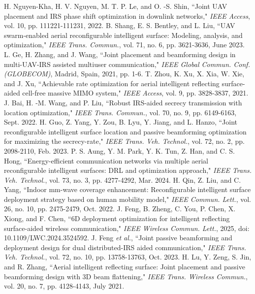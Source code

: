 \documentclass{IEEEoj}
\begin{document}
\begin{thebibliography}{00}
	 H. Nguyen-Kha, H. V. Nguyen, M. T. P. Le, and O. -S. Shin, “Joint UAV placement and IRS phase shift optimization in downlink networks," \textit{IEEE Access}, vol. 10, pp. 111221-111231, 2022.
	 B. Shang, E. S. Bentley, and L. Liu, “UAV swarm-enabled aerial reconfigurable intelligent surface: Modeling, analysis, and optimization," \textit{IEEE Trans. Commun.}, vol. 71, no. 6, pp. 3621-3636, June 2023.
	 L. Ge, H. Zhang, and J. Wang, “Joint placement and beamforming design in multi-UAV-IRS assisted multiuser communication," \textit{IEEE Global Commun. Conf. (GLOBECOM)}, Madrid, Spain, 2021, pp. 1-6.
	 T. Zhou, K. Xu, X. Xia, W. Xie, and J. Xu, “Achievable rate optimization for aerial intelligent reflecting surface-aided cell-free massive MIMO system," \textit{IEEE Access}, vol. 9, pp. 3828-3837, 2021.
	 J. Bai, H. -M. Wang, and P. Liu, “Robust IRS-aided secrecy transmission with location optimization," \textit{IEEE Trans. Commun.}, vol. 70, no. 9, pp. 6149-6163, Sept. 2022.
	 H. Guo, Z. Yang, Y. Zou, B. Lyu, Y. Jiang, and L. Hanzo, “Joint reconfigurable intelligent surface location and passive beamforming optimization for maximizing the secrecy-rate," \textit{IEEE Trans. Veh. Technol.}, vol. 72, no. 2, pp. 2098-2110, Feb. 2023.
	 P. S. Aung, Y. M. Park, Y. K. Tun, Z. Han, and C. S. Hong, “Energy-efficient communication networks via multiple aerial reconfigurable intelligent surfaces: DRL and optimization approach," \textit{IEEE Trans. Veh. Technol.}, vol. 73, no. 3, pp. 4277-4292, Mar. 2024.
	 H. Qin, Z. Liu, and C. Yang, “Indoor mm-wave coverage enhancement: Reconfigurable intelligent surface deployment strategy based on human mobility model," \textit{IEEE Commun. Lett.}, vol. 26, no. 10, pp. 2475-2479, Oct. 2022.
	 J. Feng, B. Zheng, C. You, P. Chen, X. Xiong, and F. Chen, “6D deployment optimization for intelligent reflecting surface-aided wireless communication," \textit{IEEE Wireless Commun. Lett.}, 2025, doi: 10.1109/LWC.2024.3524592.
	 J. Feng \textit{et al.}, “Joint passive beamforming and deployment design for dual distributed-IRS aided communication," \textit{IEEE Trans. Veh. Technol.}, vol. 72, no. 10, pp. 13758-13763, Oct. 2023.
	 H. Lu, Y. Zeng, S. Jin, and R. Zhang, “Aerial intelligent reflecting surface: Joint placement and passive beamforming design with 3D beam flattening," \textit{IEEE Trans. Wireless Commun.}, vol. 20, no. 7, pp. 4128-4143, July 2021.

\end{thebibliography}
\end{document}
